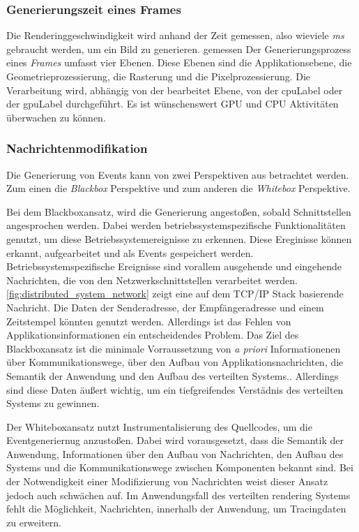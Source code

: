 \subsubsection{Generierungszeit eines Frames}
Die Renderinggeschwindigkeit wird anhand der Zeit gemessen, also wieviele \emph{ms} gebraucht werden, um ein Bild zu generieren. gemessen Der Generierungsprozess eines \emph{Frames} umfasst vier Ebenen. Diese Ebenen sind die Applikationsebene, die Geometrieprozessierung, die Rasterung und die Pixelprozessierung. Die Verarbeitung wird, abhängig von der bearbeitet Ebene, von der \gls{cpuLabel} oder der \gls{gpuLabel} durchgeführt. Es ist wünschenswert GPU und CPU Aktivitäten überwachen zu können.

\subsubsection{Nachrichtenmodifikation}

Die Generierung von Events kann von zwei Perspektiven aus betrachtet werden.
Zum einen die \emph{Blackbox} Perspektive und zum anderen die \emph{Whitebox} Perspektive.

Bei dem Blackboxansatz, wird die Generierung angestoßen, sobald Schnittstellen angesprochen werden. Dabei werden betriebssystemspezifische Funktionalitäten genutzt, um diese Betriebssystemereignisse zu erkennen. Diese Ereginisse können erkannt, aufgearbeitet und als Events gespeichert werden. Betriebssystemspezifische Ereignisse sind vorallem ausgehende und eingehende Nachrichten, die von den Netzwerkschnittstellen verarbeitet werden. \cref{fig:distributed_system_network} zeigt eine auf dem TCP/IP Stack basierende Nachricht. Die Daten der Senderadresse, der Empfängeradresse und einem Zeitstempel könnten genutzt werden. Allerdings ist das Fehlen von Applikationsinformationen ein entscheidendes Problem. Das Ziel des Blackboxansatz ist die minimale Vorraussetzung von \emph{a priori} Informationenen über Kommunikationswege, über den Aufbau von Applikationsnachrichten, die Semantik der Anwendung und den Aufbau des verteilten Systems.. Allerdings sind diese Daten äußert wichtig, um ein tiefgreifendes Verstädnis des verteilten Systems zu gewinnen. 

Der Whiteboxansatz nutzt Instrumentalisierung des Quellcodes, um die Eventgeneriernug anzustoßen. Dabei wird vorausgesetzt, dass die Semantik der Anwendung, Informationen über den Aufbau von Nachrichten, den Aufbau des Systems und die Kommunikationswege zwischen Komponenten bekannt sind. Bei der Notwendigkeit einer Modifizierung von Nachrichten weist dieser Ansatz jedoch auch schwächen auf. Im Anwendungsfall des verteilten rendering Systems fehlt die Möglichkeit, Nachrichten, innerhalb der Anwendung, um Tracingdaten zu erweitern.


